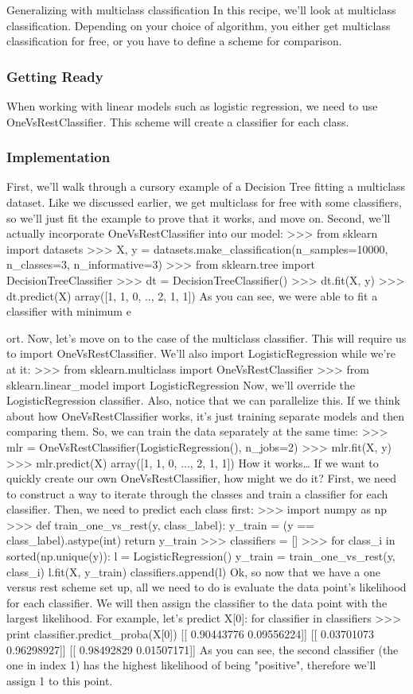 
Generalizing with multiclass classification
In this recipe, we'll look at multiclass classification. Depending on your choice of algorithm,
you either get multiclass classification for free, or you have to define a scheme for comparison.
\subsubsection*{Getting Ready}
When working with linear models such as logistic regression, we need to use
OneVsRestClassifier. This scheme will create a classifier for each class.
\subsubsection{Implementation}
First, we'll walk through a cursory example of a Decision Tree fitting a multiclass dataset.
Like we discussed earlier, we get multiclass for free with some classifiers, so we'll just fit
the example to prove that it works, and move on.
Second, we'll actually incorporate OneVsRestClassifier into our model:
>>> from sklearn import datasets
>>> X, y = datasets.make_classification(n_samples=10000, n_classes=3,
n_informative=3)
>>> from sklearn.tree import DecisionTreeClassifier
>>> dt = DecisionTreeClassifier()
>>> dt.fit(X, y)
>>> dt.predict(X)
array([1, 1, 0, .., 2, 1, 1])
As you can see, we were able to fit a classifier with minimum e\item ort.
Now, let's move on to the case of the multiclass classifier. This will require us to import
OneVsRestClassifier. We'll also import LogisticRegression while we're at it:
>>> from sklearn.multiclass import OneVsRestClassifier
>>> from sklearn.linear_model import LogisticRegression
Now, we'll override the LogisticRegression classifier. Also, notice that we can parallelize
this. If we think about how OneVsRestClassifier works, it's just training separate models
and then comparing them. So, we can train the data separately at the same time:
>>> mlr = OneVsRestClassifier(LogisticRegression(), n_jobs=2)
>>> mlr.fit(X, y)
>>> mlr.predict(X)
array([1, 1, 0, ..., 2, 1, 1])
How it works…
If we want to quickly create our own OneVsRestClassifier, how might we do it?
First, we need to construct a way to iterate through the classes and train a classifier for each
classifier. Then, we need to predict each class first:
>>> import numpy as np
>>> def train_one_vs_rest(y, class_label):
y_train = (y == class_label).astype(int)
return y_train
>>> classifiers = []
>>> for class_i in sorted(np.unique(y)):
l = LogisticRegression()
y_train = train_one_vs_rest(y, class_i)
l.fit(X, y_train)
classifiers.append(l)
Ok, so now that we have a one versus rest scheme set up, all we need to do is evaluate the
data point's likelihood for each classifier. We will then assign the classifier to the data point
with the largest likelihood.
For example, let's predict X[0]:
for classifier in classifiers
>>> print classifier.predict_proba(X[0])
[[ 0.90443776 0.09556224]]
[[ 0.03701073 0.96298927]]
[[ 0.98492829 0.01507171]]
As you can see, the second classifier (the one in index 1) has the highest likelihood of being
"positive", therefore we'll assign 1 to this point.
